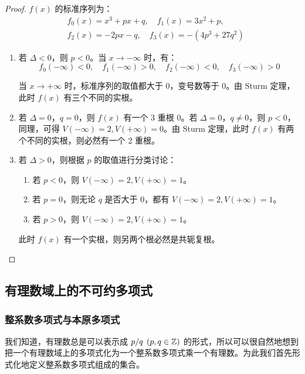 \begin{proof}
	$f(x)$ 的标准序列为：
	$$
	\begin{aligned}
		&f_0(x) = x^3 + px + q, \quad f_1(x) = 3x^2 + p,
		\\
		&f_2(x) = -2px - q, \quad f_3(x) = -(4p^3 + 27 q^2)
	\end{aligned}
	$$

	\begin{enumerate}
		\item 若 $\Delta < 0$，则 $p < 0$。当 $x \to -\infty$ 时，有：
		$$
		f_0(-\infty) < 0, \quad f_1(-\infty) > 0, \quad f_2(-\infty) < 0, \quad f_3(-\infty) > 0
		$$

		当 $x \to +\infty$ 时，标准序列的取值都大于 $0$，变号数等于 $0$。由 Sturm 定理，此时 $f(x)$ 有三个不同的实根。

		\item 若 $\Delta = 0$，$q = 0$，则 $f(x)$ 有一个 3 重根 $0$。若 $\Delta = 0$，$q \ne 0$，则 $p < 0$，同理，可得 $V(-\infty) = 2, V(+\infty) = 0$。由 Sturm 定理，此时 $f(x)$ 有两个不同的实根，则必然有一个 2 重根。

		\item 若 $\Delta > 0$，则根据 $p$ 的取值进行分类讨论：
		\begin{enumerate}
			\item 若 $p < 0$，则 $V(-\infty) = 2, V(+\infty) = 1$。
			\item 若 $p = 0$，则无论 $q$ 是否大于 $0$，都有 $V(-\infty) = 2, V(+\infty) = 1$。
			\item 若 $p > 0$，则 $V(-\infty) = 2, V(+\infty) = 1$。
		\end{enumerate}

		此时 $f(x)$ 有一个实根，则另两个根必然是共轭复根。
	\end{enumerate}
\end{proof}


\subsection{有理数域上的不可约多项式}

\subsubsection{整系数多项式与本原多项式}

我们知道，有理数总是可以表示成 $p / q \pod{p, q \in \mathbb Z}$ 的形式，所以可以很自然地想到把一个有理数域上的多项式化为一个整系数多项式乘一个有理数。为此我们首先形式化地定义整系数多项式组成的集合。

